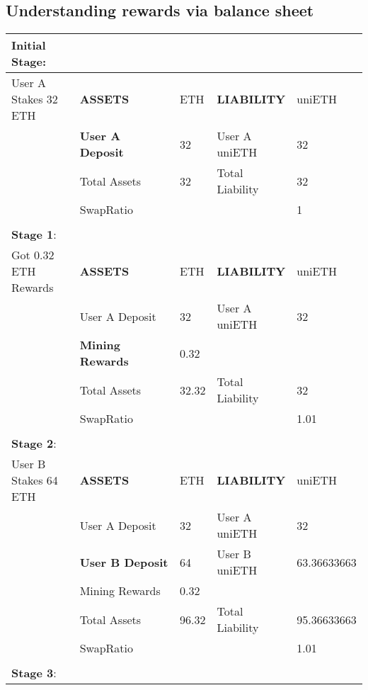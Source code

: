 \documentclass{article}
\begin{document}
\subsection{Understanding rewards via balance sheet}
\begin{table}[!ht]
    \centering
    \begin{tabular}{p{0.2\linewidth} | p{0.3\linewidth}| p{0.1\linewidth}| p{0.2\linewidth}| p{0.2\linewidth}}
    \hline
        \textbf{Initial Stage}:  & ~ & ~ & ~ & ~ \\ \hline
        User A Stakes 32 ETH & \textbf{ASSETS} & ETH & \textbf{LIABILITY} & uniETH \\ \hline
        ~ & \textbf{User A Deposit} & 32 & User A uniETH & 32 \\ \hline
        ~ & Total Assets & 32 & Total Liability & 32 \\ \hline
        ~ & SwapRatio & ~ & ~ & 1 \\ \hline
        \multicolumn{5}{c}{} \\ \hline
        \textbf{Stage 1}:  & ~ & ~ & ~ & ~ \\ \hline
        Got 0.32 ETH Rewards & \textbf{ASSETS} & ETH & \textbf{LIABILITY} & uniETH \\ \hline
        ~ & User A Deposit & 32 & User A uniETH & 32 \\ \hline
        ~ & \textbf{Mining Rewards} & 0.32 & ~ & ~ \\ \hline
        ~ & Total Assets & 32.32 & Total Liability & 32 \\ \hline
        ~ & SwapRatio & ~ & ~ & 1.01 \\ \hline
        \multicolumn{5}{c}{} \\ \hline
        \textbf{Stage 2}:  & ~ & ~ & ~ & ~ \\ \hline
        User B Stakes 64 ETH & \textbf{ASSETS} & ETH & \textbf{LIABILITY} & uniETH \\ \hline
        ~ & User A Deposit & 32 & User A uniETH & 32 \\ \hline
        ~ & \textbf{User B Deposit} & 64 & User B uniETH & 63.36633663 \\ \hline
        ~ & Mining Rewards & 0.32 & ~ & ~ \\ \hline
        ~ & Total Assets & 96.32 & Total Liability & 95.36633663 \\ \hline
        ~ & SwapRatio & ~ & ~ & 1.01 \\ \hline
        \multicolumn{5}{c}{} \\ \hline
        \textbf{Stage 3}: & ~ & ~ & ~ & ~ \\ \hline

\end{tabular}
\end{table}
\end{document}
